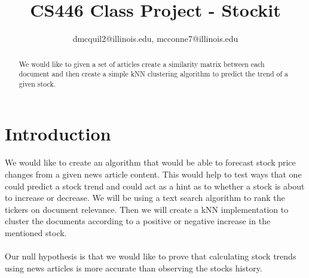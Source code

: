 \documentclass[11pt,letterpaper]{article}
\newcommand{\blue}[1]{\textcolor{RoyalBlue}{#1}}
\newcommand{\instructions}[1]{\blue{\textit{#1}}}
\begin{document}
\title{CS446 Class Project - Stockit}
\author{dmcquil2@illinois.edu, mcconne7@illinois.edu}
\maketitle




\begin{abstract}
We would like to given a set of articles create a similarity matrix between each document and then create a simple kNN clustering algorithm to predict the trend of a given stock.
\end{abstract}

\section{Introduction}
\label{sec:introduction}
We would like to create an algorithm that would be able to forecast stock price changes from a given news article content. This would help to test ways that one could predict a stock trend and could act as a hint as to whether a stock is about to increase or decrease.  We will be using a text search algorithm to rank the tickers on document relevance.  Then we will create a kNN implementation to cluster the documents according to a positive or negative increase in the mentioned stock. \\  \\
Our null hypothesis is that we would like to prove that calculating stock trends using news articles is more accurate than observing the stocks history.
\end{document}
